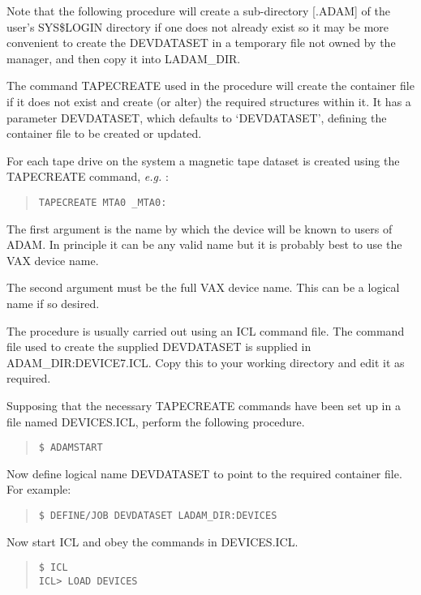 Note that the following procedure will create a sub-directory [.ADAM] of the
user's SYS\$LOGIN directory if one does not already exist so it may be more
convenient to create the DEVDATASET in a temporary file not owned by the
manager, and then copy it into LADAM\_DIR.

The command TAPECREATE used in the procedure will create the
container file if it does not exist and create (or alter) the required
structures within it.
It has a parameter DEVDATASET, which defaults to `DEVDATASET', defining
the container file to be created or updated.

For each tape drive on the system a magnetic tape dataset is created
using the TAPECREATE command, {\em e.g.} :
\small \begin{quote}
\begin{verbatim}
TAPECREATE MTA0 _MTA0:
\end{verbatim}
\end{quote} \normalsize
The first argument is the name by which the device will be known to users of
ADAM. In principle it can be any valid name but it is probably best to use
the VAX device name.

The second argument must be the full VAX device name. This can be a logical
name if so desired.

The procedure is usually carried out using an ICL command file.
The command file used to create the supplied DEVDATASET is 
supplied in ADAM\-\_DIR:\-DEV\-ICE7.ICL.
Copy this to your working directory and edit it as required.

Supposing that the necessary TAPECREATE commands have been set up
in a file named DEVICES.ICL, perform the following procedure.
\small \begin{quote}
\begin{verbatim}
$ ADAMSTART
\end{verbatim}
\end{quote} \normalsize
Now define logical name DEVDATASET to point to the required container file.
For example:
\small \begin{quote}
\begin{verbatim}
$ DEFINE/JOB DEVDATASET LADAM_DIR:DEVICES
\end{verbatim}
\end{quote} \normalsize
Now start ICL and obey the commands in DEVICES.ICL.
\small \begin{quote}
\begin{verbatim}
$ ICL
ICL> LOAD DEVICES
\end{verbatim}
\end{quote} \normalsize

